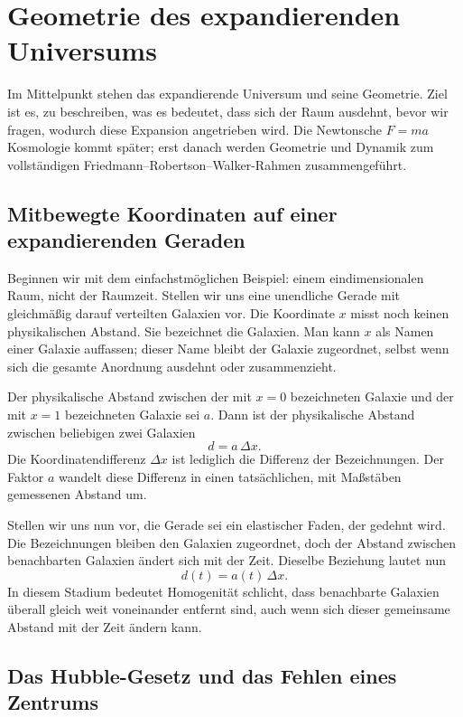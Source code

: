 \chapter{Geometrie des expandierenden Universums}

Im Mittelpunkt stehen das expandierende Universum und seine Geometrie. Ziel ist es, zu beschreiben, was es bedeutet, dass sich der Raum ausdehnt, bevor wir fragen, wodurch diese Expansion angetrieben wird. Die Newtonsche \(F=ma\) Kosmologie kommt später; erst danach werden Geometrie und Dynamik zum vollständigen Friedmann--Robertson--Walker-Rahmen zusammengeführt.

\section{Mitbewegte Koordinaten auf einer expandierenden Geraden}

Beginnen wir mit dem einfachstmöglichen Beispiel: einem eindimensionalen Raum, nicht der Raumzeit. Stellen wir uns eine unendliche Gerade mit gleichmäßig darauf verteilten Galaxien vor. Die Koordinate \(x\) misst noch keinen physikalischen Abstand. Sie bezeichnet die Galaxien. Man kann \(x\) als Namen einer Galaxie auffassen; dieser Name bleibt der Galaxie zugeordnet, selbst wenn sich die gesamte Anordnung ausdehnt oder zusammenzieht.

Der physikalische Abstand zwischen der mit \(x=0\) bezeichneten Galaxie und der mit \(x=1\) bezeichneten Galaxie sei \(a\). Dann ist der physikalische Abstand zwischen beliebigen zwei Galaxien
\begin{equation}
d=a\,\Delta x.
\end{equation}
Die Koordinatendifferenz \(\Delta x\) ist lediglich die Differenz der Bezeichnungen. Der Faktor \(a\) wandelt diese Differenz in einen tatsächlichen, mit Maßstäben gemessenen Abstand um.

Stellen wir uns nun vor, die Gerade sei ein elastischer Faden, der gedehnt wird. Die Bezeichnungen bleiben den Galaxien zugeordnet, doch der Abstand zwischen benachbarten Galaxien ändert sich mit der Zeit. Dieselbe Beziehung lautet nun
\begin{equation}
d(t)=a(t)\,\Delta x.
\end{equation}
In diesem Stadium bedeutet Homogenität schlicht, dass benachbarte Galaxien überall gleich weit voneinander entfernt sind, auch wenn sich dieser gemeinsame Abstand mit der Zeit ändern kann.

\section{Das Hubble-Gesetz und das Fehlen eines Zentrums}

